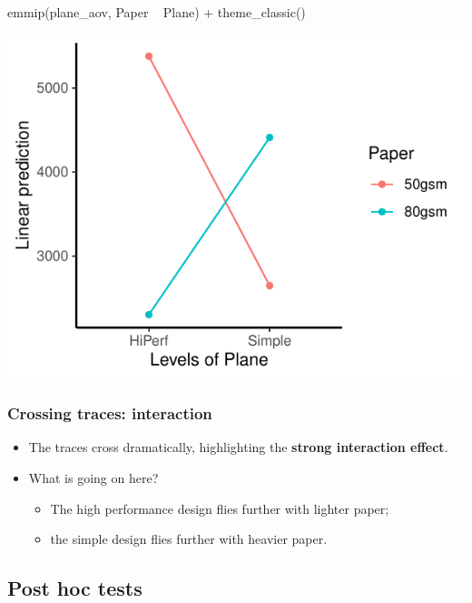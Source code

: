 \documentclass[a4paper]{article}
\begin{document}
\begin{minipage}[t]{0.49\textwidth}
\begin{Schunk}
\begin{Sinput}
emmip(plane_aov, Paper ~ Plane) +
  theme_classic()
\end{Sinput}


{\centering \includegraphics[width=\maxwidth]{figure/listings-unnamed-chunk-325-1} 

}

\end{Schunk}
\end{minipage}
\subsubsection{Crossing traces: interaction}
\begin{itemize}
	\item The traces cross dramatically, highlighting the \textcolor{myred}{\textbf{strong interaction effect}}.
	\item What is going on here?
	\begin{itemize}
		\item The high performance design flies further with lighter paper;
		\item the simple design flies further with heavier paper.
	\end{itemize}
\end{itemize}
\subsection{Post hoc tests}
\end{document}
